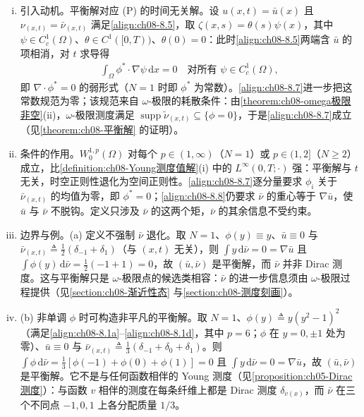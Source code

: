 \documentclass[../../main.tex]{subfiles}%
\begin{document}
\begin{remark}\label{remark:ch08-Young平衡解}
\begin{enumerate}[(i)]
\item 引入动机。平衡解对应 (P) 的时间无关解。设 $u(x,t)=\bar u(x)$ 且 $\nu_{(x,t)}=\bar\nu_{(x,t)}$ 满足\eqref{align:ch08-8.5}，取 $\zeta(x,s)=\theta(s)\psi(x)$，其中 $\psi\in C^1_c(\Omega)$、$\theta\in C^1([0,T))$、$\theta(0)=0$：此时\eqref{align:ch08-8.5}两端含 $\bar u$ 的项相消，对 $t$ 求导得
\begin{align*}
\int_\Omega\phi^*\cdot\nabla\psi\,\mathrm{d}x=0\quad\text{对所有 }\psi\in C^1_c(\Omega),
\end{align*}
即 $\nabla\cdot\phi^*=0$ 的弱形式（$N=1$ 时即 $\phi^*$ 为常数）。\eqref{align:ch08-8.7}进一步把这常数规范为零；该规范来自 $\omega$-极限的耗散条件：由\cref{theorem:ch08-omega极限非空}(ii)，$\omega$-极限测度满足 $\operatorname{supp}\tilde\nu_{(x,t)}\subseteq\{\phi=0\}$，于是\eqref{align:ch08-8.7}成立（见\cref{theorem:ch08-平衡解} 的证明）。
\item 条件的作用。$W^{1,p}_0(\Omega)$ 对每个 $p\in(1,\infty)$（$N=1$）或 $p\in(1,2]$（$N\geqslant2$）成立，比\cref{definition:ch08-Young测度值解}(i) 中的 $L^\infty(0,T;\cdot)$ 强：平衡解与 $t$ 无关，时空正则性退化为空间正则性。\eqref{align:ch08-8.7}逐分量要求 $\phi_i$ 关于 $\bar\nu_{(x,t)}$ 的均值为零，即 $\phi^*=0$；\eqref{align:ch08-8.8}仍要求 $\bar\nu$ 的重心等于 $\nabla\bar u$，使 $\bar u$ 与 $\bar\nu$ 不脱钩。定义只涉及 $\bar\nu$ 的这两个矩，$\bar\nu$ 的其余信息不受约束。
\item 边界与例。(a) 定义不强制 $\bar\nu$ 退化。取 $N=1$、$\phi(y)\equiv y$、$\bar u\equiv0$ 与 $\bar\nu_{(x,t)}\triangleq\frac12(\delta_{-1}+\delta_1)$（与 $(x,t)$ 无关），则 $\int y\,\mathrm{d}\bar\nu=0=\nabla\bar u$ 且 $\int\phi(y)\,\mathrm{d}\bar\nu=\frac12(-1+1)=0$，故 $(\bar u,\bar\nu)$ 是平衡解，而 $\bar\nu$ 并非 Dirac 测度。这与平衡解只是 $\omega$-极限点的候选类相容：$\bar\nu$ 的进一步信息须由 $\omega$-极限过程提供（见\cref{section:ch08-渐近性态} 与\cref{section:ch08-测度刻画}）。
\item (b) 非单调 $\phi$ 时可构造非平凡的平衡解。取 $N=1$、$\phi(y)\triangleq y(y^2-1)^2$（满足\eqref{align:ch08-8.1a}--\eqref{align:ch08-8.1d}，其中 $p=6$；$\phi$ 在 $y=0,\pm1$ 处为零）、$\bar u\equiv0$ 与 $\bar\nu_{(x,t)}\triangleq\frac13(\delta_{-1}+\delta_0+\delta_1)$。则 $\int\phi\,\mathrm{d}\bar\nu=\frac13[\phi(-1)+\phi(0)+\phi(1)]=0$ 且 $\int y\,\mathrm{d}\bar\nu=0=\nabla\bar u$，故 $(\bar u,\bar\nu)$ 是平衡解。它不是与任何函数相伴的 Young 测度（见\cref{proposition:ch05-Dirac测度}）：与函数 $v$ 相伴的测度在每条纤维上都是 Dirac 测度 $\delta_{v(x)}$，而 $\bar\nu$ 在三个不同点 $-1,0,1$ 上各分配质量 $1/3$。
\end{enumerate}
\end{remark}
\end{document}
